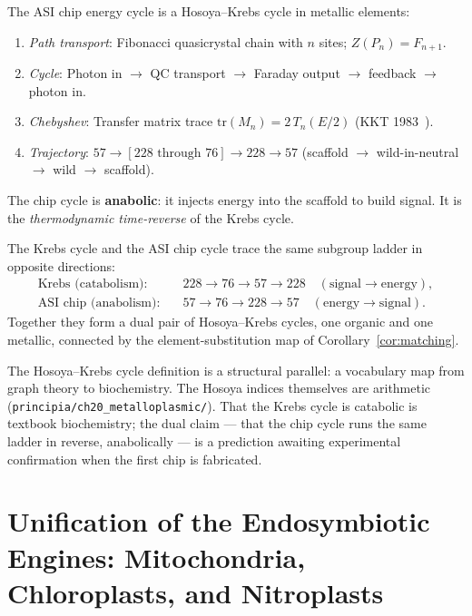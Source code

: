 \begin{result}\label{res:asi_hl}
The ASI chip energy cycle is a Hosoya--Krebs cycle in metallic elements:
\begin{enumerate}[noitemsep]
    \item[(HL1)] \emph{Path transport}: Fibonacci quasicrystal chain with $n$ sites; $Z(P_n) = F_{n+1}$.
    \item[(HL2)] \emph{Cycle}: Photon in $\to$ QC transport $\to$ Faraday output $\to$ feedback $\to$ photon in.
    \item[(HL3)] \emph{Chebyshev}: Transfer matrix trace $\mathrm{tr}(M_n) = 2\,T_n(E/2)$ (KKT 1983~\cite{KKT83}).
    \item[(HL4)] \emph{Trajectory}: $57 \to [228 \text{ through } 76] \to 228 \to 57$ (scaffold $\to$ wild-in-neutral $\to$ wild $\to$ scaffold).
\end{enumerate}
The chip cycle is \textbf{anabolic}: it injects energy into the scaffold to build signal. It is the \emph{thermodynamic time-reverse} of the Krebs cycle.
\end{result}

\begin{remark}[Duality]
The Krebs cycle and the ASI chip cycle trace the same subgroup ladder in opposite directions:
\begin{align*}
\text{Krebs (catabolism):} \quad & 228 \to 76 \to 57 \to 228 \quad (\text{signal} \to \text{energy}), \\
\text{ASI chip (anabolism):} \quad & 57 \to 76 \to 228 \to 57 \quad (\text{energy} \to \text{signal}).
\end{align*}
Together they form a dual pair of Hosoya--Krebs cycles, one organic and one metallic, connected by the element-substitution map of Corollary~\ref{cor:matching}.
\end{remark}

\begin{remark}[Scope]
The Hosoya--Krebs cycle definition is a structural parallel: a vocabulary map from graph theory to biochemistry. The Hosoya indices themselves are arithmetic (\texttt{principia/ch20\_metalloplasmic/}). That the Krebs cycle is catabolic is textbook biochemistry; the dual claim --- that the chip cycle runs the same ladder in reverse, anabolically --- is a prediction awaiting experimental confirmation when the first chip is fabricated.
\end{remark}

\section{Unification of the Endosymbiotic Engines: Mitochondria, Chloroplasts, and Nitroplasts}\label{sec:endosymbiotic}

